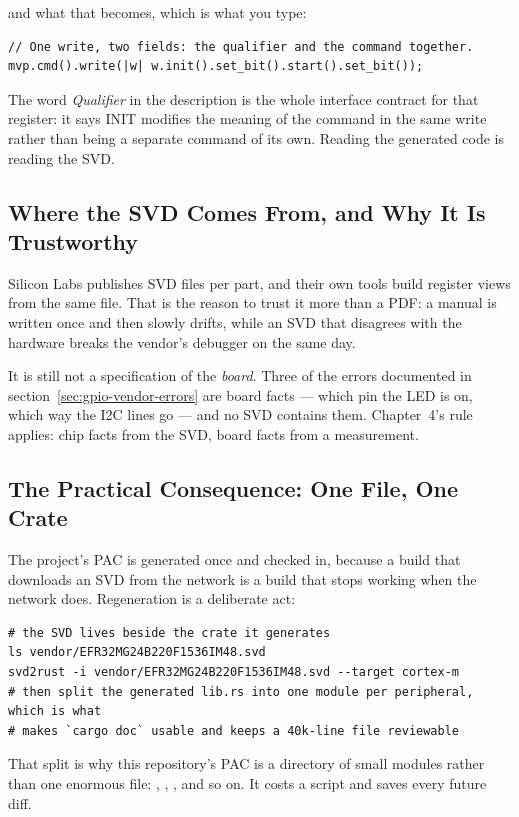 and what that becomes, which is what you type:

\begin{verbatim}
// One write, two fields: the qualifier and the command together.
mvp.cmd().write(|w| w.init().set_bit().start().set_bit());
\end{verbatim}

The word \emph{Qualifier} in the description is the whole interface contract for that register: it
says INIT modifies the meaning of the command in the same write rather than being a separate command
of its own. Reading the generated code is reading the SVD.

\subsection{Where the SVD Comes From, and Why It Is Trustworthy}

Silicon Labs publishes SVD files per part, and their own tools build register views from the same
file. That is the reason to trust it more than a PDF: a manual is written once and then slowly drifts,
while an SVD that disagrees with the hardware breaks the vendor's debugger on the same day.

It is still not a specification of the \emph{board}. Three of the errors documented in
section~\ref{sec:gpio-vendor-errors} are board facts — which pin the LED is on, which way the I2C
lines go — and no SVD contains them. Chapter~4's rule applies: chip facts from the SVD, board facts
from a measurement.

\subsection{The Practical Consequence: One File, One Crate}

The project's PAC is generated once and checked in, because a build that downloads an SVD from the
network is a build that stops working when the network does. Regeneration is a deliberate act:

\begin{verbatim}
# the SVD lives beside the crate it generates
ls vendor/EFR32MG24B220F1536IM48.svd
svd2rust -i vendor/EFR32MG24B220F1536IM48.svd --target cortex-m
# then split the generated lib.rs into one module per peripheral, which is what
# makes `cargo doc` usable and keeps a 40k-line file reviewable
\end{verbatim}

That split is why this repository's PAC is a directory of small modules rather than one enormous
file: , , , and so on. It costs a script
and saves every future diff.
